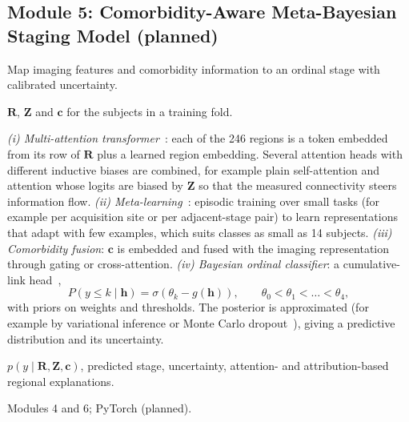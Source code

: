 \documentclass{ssnreview}
\begin{document}
\subsection{Module 5: Comorbidity-Aware Meta-Bayesian Staging Model (planned)}
\begin{modulebox}\begin{description}[leftmargin=2.6cm, style=nextline, font=\normalfont\bfseries\color{SSNBlue}]
  \item[Purpose] Map imaging features and comorbidity information to an ordinal
        stage with calibrated uncertainty.
  \item[Inputs] $\mathbf{R}$, $\mathbf{Z}$ and $\mathbf{c}$ for the subjects in
        a training fold.
  \item[Processing] \emph{(i) Multi-attention transformer}~\cite{vaswani2017}:
        each of the 246 regions is a token embedded from its row of
        $\mathbf{R}$ plus a learned region embedding. Several attention heads
        with different inductive biases are combined, for example plain
        self-attention and attention whose logits are biased by $\mathbf{Z}$
        so that the measured connectivity steers information flow.
        \emph{(ii) Meta-learning}~\cite{finn2017}: episodic training over
        small tasks (for example per acquisition site or per adjacent-stage
        pair) to learn representations that adapt with few examples, which
        suits classes as small as 14 subjects.
        \emph{(iii) Comorbidity fusion}: $\mathbf{c}$ is embedded and fused
        with the imaging representation through gating or cross-attention.
        \emph{(iv) Bayesian ordinal classifier}: a cumulative-link
        head~\cite{mccullagh1980},
        \begin{equation}
          P(y \le k \mid \mathbf{h}) = \sigma\!\left(\theta_k - g(\mathbf{h})\right),
          \qquad \theta_0 < \theta_1 < \dots < \theta_4 ,
        \end{equation}
        with priors on weights and thresholds. The posterior is approximated
        (for example by variational inference or Monte Carlo
        dropout~\cite{gal2016}), giving a predictive distribution and its
        uncertainty.
  \item[Outputs] $p(y\mid\mathbf{R},\mathbf{Z},\mathbf{c})$, predicted stage,
        uncertainty, attention- and attribution-based regional explanations.
  \item[Dependencies] Modules 4 and 6; PyTorch (planned).
\end{description}\end{modulebox}
\end{document}

